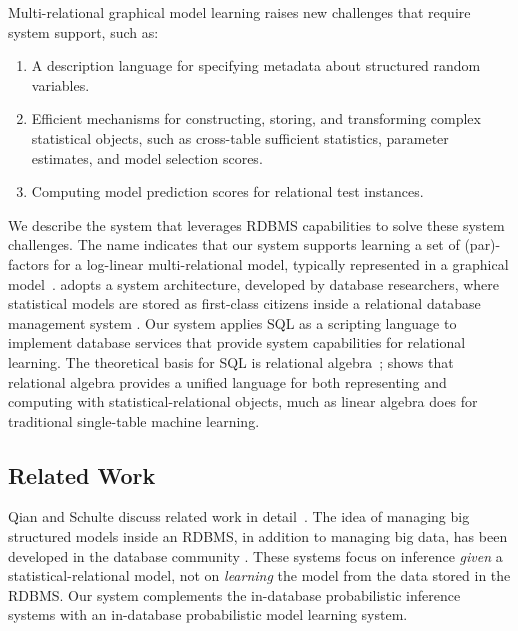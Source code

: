 \documentclass{article} %
\begin{document}
Multi-relational graphical model learning raises new challenges that require system support, such as:
\begin{enumerate}
\item A description language for specifying metadata about structured random variables.
\item Efficient mechanisms for constructing, storing, and transforming complex statistical objects, such as cross-table sufficient statistics, parameter estimates, and model selection scores.
\item Computing model prediction scores for relational test instances. 
\end{enumerate}

We describe the \FB system that leverages RDBMS capabilities to solve these system challenges. The name \FB indicates that our system supports learning a set of (par)-factors for a log-linear multi-relational model, typically represented in a graphical model~\cite{Kimmig2015}. \FB adopts  a system architecture, developed by database researchers, where statistical models are stored as first-class citizens inside a relational database management system \cite{Wang2008,Niu2011}. Our system applies SQL as a scripting language to implement database services that provide system capabilities for relational learning. 
The theoretical basis for SQL is relational algebra~\cite{Ullman1982}; \FB shows that relational algebra provides a unified language for both representing and computing with statistical-relational objects, much as linear algebra does for traditional single-table machine learning. 

\subsection{Related Work} Qian and Schulte discuss related work in detail~\cite{Qian2015}. The idea of managing big structured models inside an RDBMS, in addition to managing big data, has been developed in the database community \cite{Wang2008,Niu2011}. 
%
These systems focus  on inference {\em given} a statistical-relational model, not on {\em learning} the model from the data stored in the RDBMS. 
Our \FB system complements the in-database probabilistic inference systems with an in-database probabilistic model learning system. 
\end{document}
